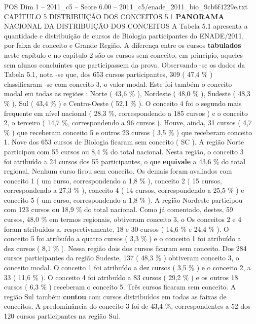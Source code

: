 \begin{textsample}{POS Dim 1 – 2011\_c5 – Score 6.00 – 2011\_c5/enade\_2011\_bio\_9cb6f4229e.txt}  \label{ex:f1_pos_125}
CAPÍTULO 5 DISTRIBUIÇÃO DOS CONCEITOS 5.1 \textbf{PANORAMA} NACIONAL DA DISTRIBUIÇÃO DOS CONCEITOS A Tabela 5.1 apresenta a quantidade e distribuição de cursos de Biologia participantes do ENADE/2011, por faixa de conceito e Grande Região.
A diferença entre os cursos \textbf{tabulados} neste capítulo e no capítulo 2 são os cursos sem conceito, em princípio, aqueles sem alunos concluintes que participassem da prova.
Observando -se os dados da Tabela 5.1, nota -se que, dos 653 cursos participantes, 309 ( 47,4 \% ) classificaram -se com conceito 3, o valor modal.
Este foi também o conceito modal em todas as regiões : Norte ( 43,6 \% ), Nordeste ( 48,0 \% ), Sudeste ( 48,3 \% ), Sul ( 43,4 \% ) e Centro-Oeste ( 52,1 \% ).
O conceito 4 foi o segundo mais frequente em nível nacional ( 28,3 \%, correspondendo a 185 cursos ) e o conceito 2, o terceiro ( 14,7 \%, correspondendo a 96 cursos ).
Houve, ainda, 31 cursos ( 4,7 \% ) que receberam conceito 5 e outros 23 cursos ( 3,5 \% ) que receberam conceito 1.
Nove dos 653 cursos de Biologia ficaram sem conceito ( SC ).
A região Norte participou com 55 cursos ou 8,4 \% do total nacional.
Nesta região, o conceito 3 foi atribuído a 24 cursos dos 55 participantes, o que \textbf{equivale} a 43,6 \% do total regional.
Nenhum curso ficou sem conceito.
Os demais foram avaliados com conceito 1 ( um curso, correspondendo a 1,8 \% ), conceito 2 ( 15 cursos, correspondendo a 27,3 \% ), conceito 4 ( 14 cursos, correspondendo a 25,5 \% ) e conceito 5 ( um curso, correspondendo a 1,8 \% ).
A região Nordeste participou com 123 cursos ou 18,9 \% do total nacional.
Como já comentado, destes, 59 cursos, 48,0 \% em termos regionais, obtiveram conceito 3, o Os conceitos 2 e 4 foram atribuídos a, respectivamente, 18 e 30 cursos ( 14,6 \% e 24,4 \% ).
O conceito 5 foi atribuído a quatro cursos ( 3,3 \% ) e o conceito 1 foi atribuído a dez cursos ( 8,1 \% ).
Nessa região dois dos cursos ficaram sem conceito.
Dos 284 cursos participantes da região Sudeste, 137 ( 48,3 \% ) obtiveram conceito 3, o conceito modal.
O conceito 1 foi atribuído a dez cursos ( 3,5 \% ) e o conceito 2, a 33 ( 11,6 \% ).
O conceito 4 foi atribuído a 83 cursos ( 29,2 \% ) e os outros 18 cursos ( 6,3 \% ) receberam o conceito 5.
Três cursos ficaram sem conceito.
A região Sul também \textbf{contou} com cursos distribuídos em todas as faixas de conceitos.
A predominância do conceito 3 foi de 43,4 \%, correspondentes a 52 dos 120 cursos participantes na região Sul.

\end{textsample}
